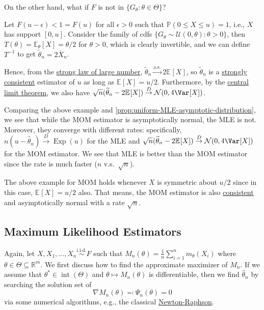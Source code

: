 On the other hand, what if \(F\) is not in \(\{ G_\theta \colon \theta \in \Theta \} \)?

\begin{eg}[Uniform]
	Let \(F(u - \epsilon ) < 1 = F(u)\) for all \(\epsilon > 0\) such that \(\mathbb{P} (0 \leq X \leq u) = 1\), i.e., \(X\) has support \([0, u]\). Consider the family of cdfs \(\{ G_\theta \sim \mathcal{U} (0, \theta ) \colon \theta > 0 \} \), then \(T(\theta ) = \mathbb{E}_{\theta }[X] = \theta / 2 \) for \(\theta > 0\), which is clearly invertible, and we can define \(T^{-1} \) to get \(\widetilde{\theta} _n = 2 \overline{X} _n\).

	Hence, from the \hyperref[thm:SLLN]{strong law of large number}, \(\widetilde{\theta} _n \overset{\text{a.s.} }{\to} 2 \mathbb{E}_{}[X] \), so \(\widetilde{\theta} _n\) is a \hyperref[def:strongly-consistent]{strongly consistent} estimator of \(u\) as long as \(\mathbb{E}_{}[X] = u / 2\). Furthermore, by the \hyperref[thm:CLT]{central limit theorem}, we also have \(\sqrt{n} (\widetilde{\theta} _n - 2 \mathbb{E}_{}[X] ) \overset{D}{\to} \mathcal{N} (0, 4 \Var_{}[X] )\).
\end{eg}

Comparing the above example and \autoref{prop:uniform-MLE-asymptotic-distribution}, we see that while the MOM estimator is asymptotically normal, the MLE is not. Moreover, they converge with different rates: specifically, \(n(u - \hat{\theta} _n) \overset{D}{\to} \operatorname{Exp}(u) \) for the MLE and \(\sqrt{n} (\widetilde{\theta} _n - 2 \mathbb{E}_{}[X] ) \overset{D}{\to} \mathcal{N} (0, 4 \Var_{}[X] )\) for the MOM estimator. We see that MLE is better than the MOM estimator since the rate is much faster (\(n\) v.s.\ \(\sqrt{n} \)).

\begin{remark}
	The above example for MOM holds whenever \(X\) is symmetric about \(u / 2\) since in this case, \(\mathbb{E}_{}[X] = u / 2\) also. That means, the MOM estimator is also \hyperref[def:consistent]{consistent} and asymptotically normal with a rate \(\sqrt{n} \).
\end{remark}

\subsection{Maximum Likelihood Estimators}
Again, let \(X, X_1, \dots , X_n \overset{\text{i.i.d.} }{\sim } F\) such that \(M_n(\theta ) = \frac{1}{n}\sum_{i=1}^{n} m_\theta (X_i)\) where \(\theta \in \Theta \subseteq \mathbb{R} ^m\). We first discuss how to find the approximate maximizer of \(M_n\). If we assume that \(\theta ^{\ast} \in \operatorname{int}(\Theta ) \) and \(\theta \mapsto M_n(\theta )\) is differentiable, then we find \(\hat{\theta} _n\) by searching the solution set of
\[
	\nabla M_n(\theta )
	\eqqcolon \Psi _n(\theta )
	= 0
\]
via some numerical algorithms, e.g., the classical \href{https://en.wikipedia.org/wiki/Newton%27s_method}{Newton-Raphson}.

